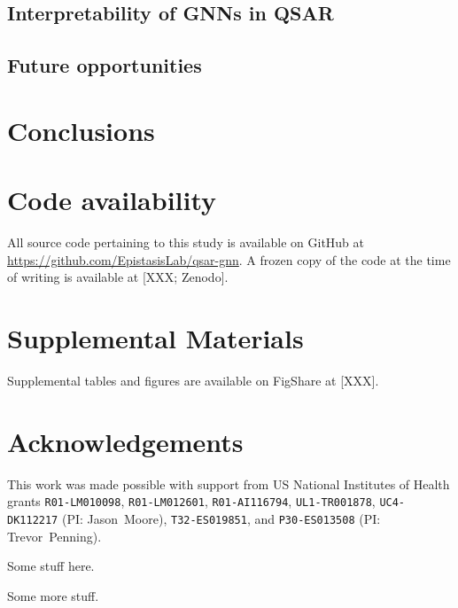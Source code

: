 \documentclass{ws-procs11x85}
\begin{document}
\subsection{Interpretability of GNNs in QSAR}

\subsection{Future opportunities}

\section{Conclusions}

\section{Code availability}
All source code pertaining to this study is available on GitHub at \url{https://github.com/EpistasisLab/qsar-gnn}.
A frozen copy of the code at the time of writing is available at [XXX; Zenodo].

\section{Supplemental Materials}
Supplemental tables and figures are available on FigShare at [XXX].

\section*{Acknowledgements}
This work was made possible with support from US National Institutes of Health grants \texttt{R01-LM010098}, \texttt{R01-LM012601}, \texttt{R01-AI116794}, \texttt{UL1-TR001878}, \texttt{UC4-DK112217} (PI: Jason~Moore), \texttt{T32-ES019851}, and \texttt{P30-ES013508} (PI: Trevor~Penning).

\label{GCNN}
Some stuff here.

\label{NC}
Some more stuff.



\end{document}
